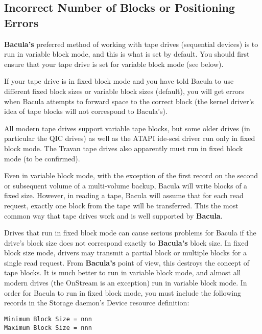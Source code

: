 \label{IncorrectBlocks}
\subsection{Incorrect Number of Blocks or Positioning Errors}

{\bf Bacula's} preferred method of working with tape drives (sequential
devices) is to run in variable block mode, and this is what is set by default.
You should first ensure that your tape drive is set for variable block mode
(see below).

If your tape drive is in fixed block mode and you have told Bacula to use
different fixed block sizes or variable block sizes (default), you will get
errors when Bacula attempts to forward space to the correct block (the kernel
driver's idea of tape blocks will not correspond to Bacula's).

All modern tape drives support variable tape blocks, but some older drives (in
particular the QIC drives) as well as the ATAPI ide-scsi driver run only in
fixed block mode. The Travan tape drives also apparently must run in fixed
block mode (to be confirmed).

Even in variable block mode, with the exception of the first record on the
second or subsequent volume of a multi-volume backup, Bacula will write blocks
of a fixed size. However, in reading a tape, Bacula will assume that for each
read request, exactly one block from the tape will be transferred. This the
most common way that tape drives work and is well supported by {\bf Bacula}.

Drives that run in fixed block mode can cause serious problems for Bacula if
the drive's block size does not correspond exactly to {\bf Bacula's} block
size. In fixed block size mode, drivers may transmit a partial block or
multiple blocks for a single read request. From {\bf Bacula's} point of view,
this destroys the concept of tape blocks. It is much better to run in variable
block mode, and almost all modern drives (the OnStream is an exception) run in
variable block mode. In order for Bacula to run in fixed block mode, you must
include the following records in the Storage daemon's Device resource
definition:

\footnotesize
\begin{verbatim}
Minimum Block Size = nnn
Maximum Block Size = nnn
\end{verbatim}
\normalsize

